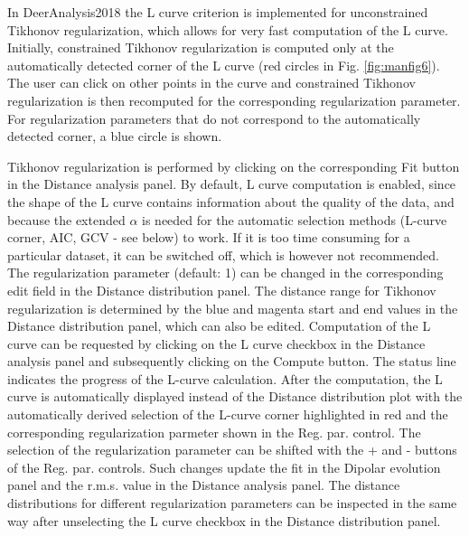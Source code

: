 \documentclass{article}
\begin{document}
In DeerAnalysis2018 the L curve criterion is implemented for unconstrained Tikhonov regularization, which allows for very fast computation of the L curve. Initially, constrained Tikhonov regularization is computed only at the automatically detected corner of the L curve (red circles in Fig. \ref{fig:manfig6}). The user can click on other points in the curve and constrained Tikhonov regularization is then recomputed for the corresponding regularization parameter. For regularization parameters that do not correspond to the automatically detected corner, a blue circle is shown.

Tikhonov regularization is performed by clicking on the corresponding {\ttfamily Fit} button in the {\ttfamily Distance analysis} panel. By default, L curve computation is enabled, since the shape of the L curve contains information about the quality of the data, and because the extended $\alpha$ is needed for the automatic selection methods (L-curve corner, AIC, GCV - see below) to work. If it is too time consuming for a particular dataset, it can be switched off, which is however not recommended. The regularization parameter (default: 1) can be changed in the corresponding edit field in the {\ttfamily Distance distribution} panel. The distance range for Tikhonov regularization is determined by the blue and magenta start and end values in the {\ttfamily Distance distribution} panel, which can also be edited. Computation of the L curve can be requested by clicking on the {\ttfamily L curve} checkbox in the {\ttfamily Distance analysis} panel and subsequently clicking on the {\ttfamily Compute} button. The status line indicates the progress of the L-curve calculation. After the computation, the L curve is automatically displayed instead of the {\ttfamily Distance distribution} plot with the automatically derived selection of the L-curve corner highlighted in red and the corresponding regularization parmeter shown in the {\ttfamily Reg. par.} control. The selection of the regularization parameter can be shifted with the {\ttfamily +} and {\ttfamily -} buttons of the {\ttfamily Reg. par.} controls. Such changes update the fit in the {\ttfamily Dipolar evolution} panel and the r.m.s. value in the {\ttfamily Distance analysis} panel. The distance distributions for different regularization parameters can be inspected in the same way after unselecting the {\ttfamily L curve} checkbox in the {\ttfamily Distance distribution} panel.
\end{document}
